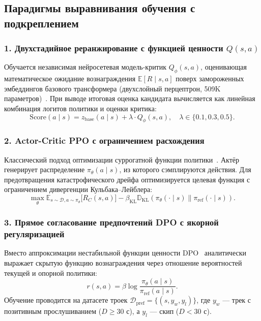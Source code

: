\subsection{Парадигмы выравнивания обучения с подкреплением}

\subsubsection{1. Двухстадийное реранжирование с функцией ценности $Q(s, a)$}
Обучается независимая нейросетевая модель-критик $Q_\phi(s, a)$, оценивающая математическое ожидание вознаграждения $\mathbb{E}[R \mid s, a]$ поверх замороженных эмбеддингов базового трансформера (двухслойный перцептрон, 509K параметров)~\cite{petrov2024aligning}. При выводе итоговая оценка кандидата вычисляется как линейная комбинация логитов политики и оценки критика:
\begin{equation}
    \text{Score}(a \mid s) = z_{\text{base}}(a \mid s) + \lambda \cdot Q_\phi(s, a), \quad \lambda \in \{0.1, 0.3, 0.5\}.
\end{equation}

\subsubsection{2. Actor-Critic PPO с ограничением расхождения}
Классический подход оптимизации суррогатной функции политики~\cite{schulman2017proximal}. Актёр генерирует распределение $\pi_\theta(a \mid s)$, из которого сэмплируются действия. Для предотвращения катастрофического дрейфа оптимизируется целевая функция с ограничением дивергенции Кульбака--Лейблера:
\begin{equation}
    \max_\theta \mathbb{E}_{s \sim \mathcal{D}, a \sim \pi_\theta} \big[ R_C(s, a) \big] - \beta_{\text{KL}} \mathbb{D}_{\text{KL}}(\pi_\theta(\cdot \mid s) \parallel \pi_{\text{ref}}(\cdot \mid s)).
\end{equation}

\subsubsection{3. Прямое согласование предпочтений DPO с якорной регуляризацией}
Вместо аппроксимации нестабильной функции ценности DPO~\cite{rafailov2023direct} аналитически выражает скрытую функцию вознаграждения через отношение вероятностей текущей и опорной политики:
\begin{equation}
    r(s, a) = \beta \log \frac{\pi_\theta(a \mid s)}{\pi_{\text{ref}}(a \mid s)}.
\end{equation}
Обучение проводится на датасете троек $\mathcal{D}_{\text{pref}} = \{(s, y_w, y_l)\}$, где $y_w$ — трек с позитивным прослушиванием ($D \ge 30$ с), а $y_l$ — скип ($D < 30$ с). 

